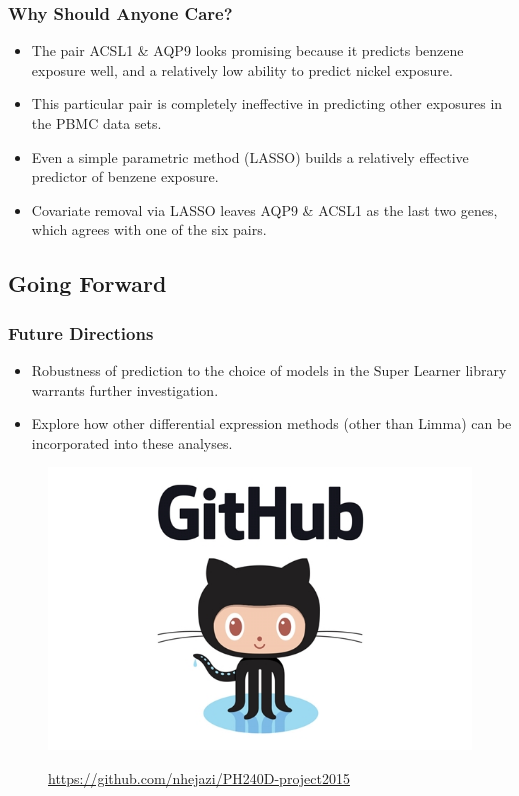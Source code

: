 \documentclass{beamer}
\begin{document}
\begin{frame}[fragile]
  	\frametitle{Why Should Anyone Care?}
 		\begin{itemize}
			\item The pair ACSL1 \& AQP9 looks promising because it predicts benzene exposure well, and a relatively low ability to predict nickel exposure. 
			\item This particular pair is completely ineffective in predicting other exposures in the PBMC data sets.
			\item Even a simple parametric method (LASSO) builds a relatively effective predictor of benzene exposure.
			\item Covariate removal via LASSO leaves AQP9 \& ACSL1 as the last two genes, which agrees with one of the six pairs. 
		\end{itemize}
\end{frame}

\subsection{Going Forward}

\begin{frame}[fragile]
  	\frametitle{Future Directions}
		\begin{itemize}
			\item Robustness of prediction to the choice of models in the Super Learner library warrants further investigation. 
			\item Explore how other differential expression methods (other than Limma) can be incorporated into these analyses.
		\end{itemize}
  		\begin{figure}
   			\href{https://github.com/nhejazi/PH240D-project2015}
         			{\includegraphics[scale=0.25]{../paper/figs/octocat.png}}
			\caption{\url{https://github.com/nhejazi/PH240D-project2015}}
      		\end{figure}
\end{frame}
\end{document}
